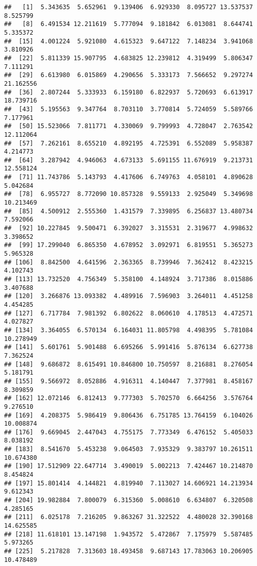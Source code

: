 \documentclass[
]{article}
\begin{document}
\begin{verbatim}
##   [1]  5.343635  5.652961  9.139406  6.929330  8.095727 13.537537  8.525799
##   [8]  6.491534 12.211619  5.777094  9.181842  6.013081  8.644741  5.335372
##  [15]  4.001224  5.921080  4.615323  9.647122  7.148234  3.941068  3.810926
##  [22]  5.811339 15.907795  4.683825 12.239812  4.319499  5.806347  7.111291
##  [29]  6.613980  6.015869  4.290656  5.333173  7.566652  9.297274 21.162556
##  [36]  2.807244  5.333933  6.159180  6.822937  5.720693  6.613917 18.739716
##  [43]  5.195563  9.347764  8.703110  3.770814  5.724059  5.589766  7.177961
##  [50] 15.523066  7.811771  4.330069  9.799993  4.728047  2.763542 12.112064
##  [57]  7.262161  8.655210  4.892195  4.725391  6.552089  5.958387  4.214773
##  [64]  3.287942  4.946063  4.673133  5.691155 11.676919  9.213731 12.558124
##  [71] 11.743786  5.143793  4.417606  6.749763  4.058101  4.890628  5.042684
##  [78]  6.955727  8.772090 10.857328  9.559133  2.925049  5.349698 10.213469
##  [85]  4.500912  2.555360  1.431579  7.339895  6.256837 13.480734  7.592066
##  [92] 10.227845  9.500471  6.392027  3.315531  2.319677  4.998632  3.398652
##  [99] 17.299040  6.865350  4.678952  3.092971  6.819551  5.365273  5.965328
## [106]  8.842500  4.641596  2.363365  8.739946  7.362412  8.423215  4.102743
## [113] 13.732520  4.756349  5.358100  4.148924  3.717386  8.015886  3.407688
## [120]  3.266876 13.093382  4.489916  7.596903  3.264011  4.451258  4.454285
## [127]  6.717784  7.981392  6.802622  8.060610  4.178513  4.472571  4.027827
## [134]  3.364055  6.570134  6.164031 11.805798  4.498395  5.781084 10.278949
## [141]  5.601761  5.901488  6.695266  5.991416  5.876134  6.627738  7.362524
## [148]  9.686872  8.615491 10.846800 10.750597  8.216881  8.276054  5.181791
## [155]  9.566972  8.052886  4.916311  4.140447  7.377981  8.458167  8.309859
## [162] 12.072146  6.812413  9.777303  5.702570  6.664256  3.576764  9.276510
## [169]  4.208375  5.986419  9.806436  6.751785 13.764159  6.104026 10.008874
## [176]  9.669045  2.447043  4.755175  7.773349  6.476152  5.405033  8.038192
## [183]  8.541670  5.453238  9.064503  7.935329  9.383797 10.261511 10.674380
## [190] 17.512909 22.647714  3.490019  5.002213  7.424467 10.214870  8.454824
## [197] 15.801414  4.144821  4.819940  7.113027 14.606921 14.213934  9.612343
## [204] 19.982884  7.800079  6.315360  5.008610  6.634807  6.320508  4.285165
## [211]  6.025178  7.216205  9.863267 31.322522  4.480028 32.390168 14.625585
## [218] 11.618101 13.147198  1.943572  5.472867  7.175979  5.587485  5.973265
## [225]  5.217828  7.313603 18.493458  9.687143 17.783063 10.206905 10.478489

\end{verbatim}
\end{document}
